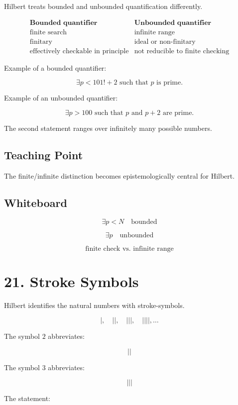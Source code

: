 \documentclass[11pt]{article}
\begin{document}
Hilbert treats bounded and unbounded quantification differently.

\[
\begin{array}{c|c}
\textbf{Bounded quantifier} & \textbf{Unbounded quantifier} \\
\hline
\text{finite search} & \text{infinite range} \\
\text{finitary} & \text{ideal or non-finitary} \\
\text{effectively checkable in principle} & \text{not reducible to finite checking}
\end{array}
\]

Example of a bounded quantifier:

\[
\exists p<101!+2 \text{ such that } p \text{ is prime.}
\]

Example of an unbounded quantifier:

\[
\exists p>100 \text{ such that } p \text{ and } p+2 \text{ are prime.}
\]

The second statement ranges over infinitely many possible numbers.

\subsection*{Teaching Point}

The finite/infinite distinction becomes epistemologically central for Hilbert.

\subsection*{Whiteboard}

\[
\exists p<N
\quad
\text{bounded}
\]

\[
\exists p
\quad
\text{unbounded}
\]

\[
\text{finite check vs. infinite range}
\]

\section*{21. Stroke Symbols}

Hilbert identifies the natural numbers with stroke-symbols.

\[
|,\quad ||,\quad |||,\quad ||||,\ldots
\]

The symbol \(2\) abbreviates:

\[
||
\]

The symbol \(3\) abbreviates:

\[
|||
\]

The statement:
\end{document}
